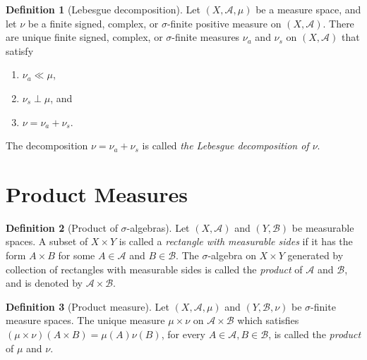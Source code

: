 \documentclass[12pt]{article}
\theoremstyle{definition}
\newtheorem{definition}{Definition}[section]
\newcommand{\algebra}{\mathscr{A}}
\begin{document}
\begin{definition}[Lebesgue decomposition]
    Let $(X,\algebra,\mu)$ be a measure space, and let $\nu$ be a finite signed, complex, or $\sigma$-finite positive measure on $(X,\algebra)$. There are unique finite signed, complex, or $\sigma$-finite measures $\nu_a$ and $\nu_s$ on $(X,\algebra)$ that satisfy
    \begin{enumerate}[label=(\alph*)]
        \item $\nu_a\ll\mu$,
        \item $\nu_s\perp\mu$, and
        \item $\nu=\nu_a+\nu_s$.
    \end{enumerate}
    The decomposition $\nu=\nu_a+\nu_s$ is called \textit{the Lebesgue decomposition of $\nu$}.
\end{definition}
\newpage
\section{Product Measures}
\begin{definition}[Product of $\sigma$-algebras]
    Let $(X,\algebra)$ and $(Y,\mathscr{B})$ be measurable spaces. A subset of $X\times Y$ is called a \textit{rectangle with measurable sides} if it has the form $A\times B$ for some $A\in\algebra$ and $B\in\mathscr{B}$. The $\sigma$-algebra on $X\times Y$ generated by collection of rectangles with measurable sides is called the \textit{product} of $\algebra$ and $\mathscr{B}$, and is denoted by $\algebra\times \mathscr{B}$.
\end{definition}
\begin{definition}[Product measure]
    Let $(X,\algebra,\mu)$ and $(Y,\mathscr{B},\nu)$ be $\sigma$-finite measure spaces. The unique measure $\mu\times\nu$ on $\algebra\times\mathscr{B}$ which satisfies $(\mu\times\nu)(A\times B)=\mu(A)\nu(B)$, for every $A\in\algebra,B\in\mathscr{B}$, is called the \textit{product} of $\mu$ and $\nu$.
\end{definition}
\newpage
\setcounter{section}{9}
\end{document}
